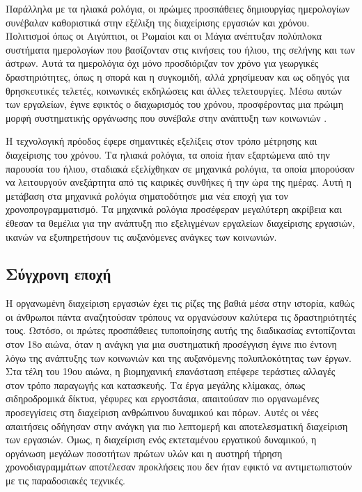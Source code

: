             Παράλληλα με τα ηλιακά ρολόγια, οι πρώιμες προσπάθειες δημιουργίας ημερολογίων συνέβαλαν καθοριστικά στην εξέλιξη της διαχείρισης εργασιών και χρόνου. Πολιτισμοί όπως οι Αιγύπτιοι, οι Ρωμαίοι και οι Μάγια ανέπτυξαν πολύπλοκα συστήματα ημερολογίων που βασίζονταν στις κινήσεις του ήλιου, της σελήνης και των άστρων. Αυτά τα ημερολόγια όχι μόνο προσδιόριζαν τον χρόνο για γεωργικές δραστηριότητες, όπως η σπορά και η συγκομιδή, αλλά χρησίμευαν και ως οδηγός για θρησκευτικές τελετές, κοινωνικές εκδηλώσεις και άλλες τελετουργίες. Μέσω αυτών των εργαλείων, έγινε εφικτός ο διαχωρισμός του χρόνου, προσφέροντας μια πρώιμη μορφή συστηματικής οργάνωσης που συνέβαλε στην ανάπτυξη των κοινωνιών \cite{Richards_2000}.

            Η τεχνολογική πρόοδος έφερε σημαντικές εξελίξεις στον τρόπο μέτρησης και διαχείρισης του χρόνου. Τα ηλιακά ρολόγια, τα οποία ήταν εξαρτώμενα από την παρουσία του ήλιου, σταδιακά εξελίχθηκαν σε μηχανικά ρολόγια, τα οποία μπορούσαν να λειτουργούν ανεξάρτητα από τις καιρικές συνθήκες ή την ώρα της ημέρας. Αυτή η μετάβαση στα μηχανικά ρολόγια σηματοδότησε μια νέα εποχή για τον χρονοπρογραμματισμό. Τα μηχανικά ρολόγια προσέφεραν μεγαλύτερη ακρίβεια και έθεσαν τα θεμέλια για την ανάπτυξη πιο εξελιγμένων εργαλείων διαχείρισης εργασιών, ικανών να εξυπηρετήσουν τις αυξανόμενες ανάγκες των κοινωνιών.

        \subsection{Σύγχρονη εποχή}
            Η οργανωμένη διαχείριση εργασιών έχει τις ρίζες της βαθιά μέσα στην ιστορία, καθώς οι άνθρωποι πάντα αναζητούσαν τρόπους να οργανώσουν καλύτερα τις δραστηριότητές τους. Ωστόσο, οι πρώτες προσπάθειες τυποποίησης αυτής της διαδικασίας εντοπίζονται στον 18ο αιώνα, όταν η ανάγκη για μια συστηματική προσέγγιση έγινε πιο έντονη λόγω της ανάπτυξης των κοινωνιών και της αυξανόμενης πολυπλοκότητας των έργων. Στα τέλη του 19ου αιώνα, η βιομηχανική επανάσταση επέφερε τεράστιες αλλαγές στον τρόπο παραγωγής και κατασκευής. Τα έργα μεγάλης κλίμακας, όπως σιδηροδρομικά δίκτυα, γέφυρες και εργοστάσια, απαιτούσαν πιο οργανωμένες προσεγγίσεις στη διαχείριση ανθρώπινου δυναμικού και πόρων. Αυτές οι νέες απαιτήσεις οδήγησαν στην ανάγκη για πιο λεπτομερή και αποτελεσματική διαχείριση των εργασιών. Όμως, η διαχείριση ενός εκτεταμένου εργατικού δυναμικού, η οργάνωση μεγάλων ποσοτήτων πρώτων υλών και η αυστηρή τήρηση χρονοδιαγραμμάτων αποτέλεσαν προκλήσεις που δεν ήταν εφικτό να αντιμετωπιστούν με τις παραδοσιακές τεχνικές.

